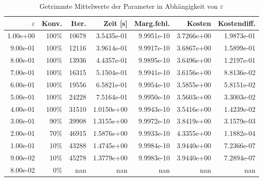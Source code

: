 \begin{table}[htbp]
\caption{Getrimmte Mittelwerte der Parameter in Abhängigkeit von $\varepsilon$}
\label{tab:Parametertest256_tol1e-09}
\small
\centering
{}
\begin{tabular}{rrrrrrr}
\toprule
$\varepsilon$ & Konv. & Iter. & Zeit [s] & Marg.fehl. & Kosten & Kostendiff. \\
\midrule
1.00e+00 & 100\% & 10678 & 3.5435e-01 & 9.9951e-10 & 3.7266e+00 & 1.9873e-01 \\
9.00e-01 & 100\% & 12116 & 3.9614e-01 & 9.9917e-10 & 3.6867e+00 & 1.5899e-01 \\
8.00e-01 & 100\% & 13936 & 4.4357e-01 & 9.9895e-10 & 3.6496e+00 & 1.2197e-01 \\
7.00e-01 & 100\% & 16315 & 5.1504e-01 & 9.9941e-10 & 3.6156e+00 & 8.8136e-02 \\
6.00e-01 & 100\% & 19556 & 6.5821e-01 & 9.9954e-10 & 3.5855e+00 & 5.8151e-02 \\
5.00e-01 & 100\% & 24228 & 7.5164e-01 & 9.9950e-10 & 3.5603e+00 & 3.3003e-02 \\
4.00e-01 & 100\% & 31510 & 1.0150e+00 & 9.9943e-10 & 3.5416e+00 & 1.4239e-02 \\
3.00e-01 & 90\% & 39908 & 1.3155e+00 & 9.9972e-10 & 3.8419e+00 & 3.1579e-03 \\
2.00e-01 & 70\% & 46915 & 1.5876e+00 & 9.9933e-10 & 4.3355e+00 & 1.1882e-04 \\
1.00e-01 & 10\% & 43288 & 1.4745e+00 & 9.9984e-10 & 3.9440e+00 & 7.2366e-07 \\
9.00e-02 & 10\% & 45278 & 1.3779e+00 & 9.9983e-10 & 3.9440e+00 & 7.2894e-07 \\
8.00e-02 & 0\% & nan & nan & nan & nan & nan \\
\bottomrule
\end{tabular}
\end{table}
